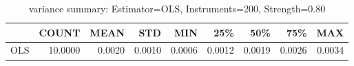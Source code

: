 \begin{table}[ht]
\centering
\caption{variance summary: Estimator=OLS, Instruments=200, Strength=0.80}
\begin{tabular}{lrrrrrrrr}
\toprule
 & COUNT & MEAN & STD & MIN & 25\% & 50\% & 75\% & MAX \\
\midrule
OLS & 10.0000 & 0.0020 & 0.0010 & 0.0006 & 0.0012 & 0.0019 & 0.0026 & 0.0034 \\
\bottomrule
\end{tabular}
\end{table}
